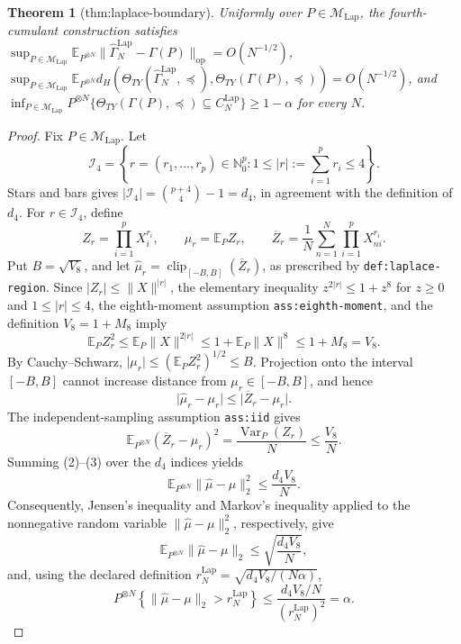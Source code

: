 \documentclass{article}
\newtheorem{theorem}{Theorem}
\begin{document}
\begin{theorem}[thm:laplace-boundary]\label{thm:laplace-boundary}
Uniformly over \(P\in\mathcal M_{\mathrm{Lap}}\), the fourth-cumulant construction satisfies \(\sup_{P\in\mathcal M_{\mathrm{Lap}}}\mathbb E_{P^{\otimes N}}\|\widehat\Gamma_N^{\mathrm{Lap}}-\Gamma(P)\|_{\mathrm{op}}=O(N^{-1/2})\), \(\sup_{P\in\mathcal M_{\mathrm{Lap}}}\mathbb E_{P^{\otimes N}}d_H(\Theta_{TY}(\widehat\Gamma_N^{\mathrm{Lap}},\preceq),\Theta_{TY}(\Gamma(P),\preceq))=O(N^{-1/2})\), and \(\inf_{P\in\mathcal M_{\mathrm{Lap}}}P^{\otimes N}\{\Theta_{TY}(\Gamma(P),\preceq)\subseteq C_N^{\mathrm{Lap}}\}\ge1-\alpha\) for every \(N\).
\end{theorem}
\begin{proof}
Fix \(P\in\mathcal M_{\mathrm{Lap}}\).  Let
\[
 \mathcal I_4=\left\{r=(r_1,\ldots,r_p)\in\mathbb N_0^p:
 1\le |r|:=\sum_{i=1}^p r_i\le 4\right\}.
\]
Stars and bars gives
\(\lvert\mathcal I_4\rvert=\binom{p+4}{4}-1=d_4\), in agreement with
the definition of \(d_4\).  For \(r\in\mathcal I_4\), define
\[
 Z_r=\prod_{i=1}^p X_i^{r_i},\qquad
 \mu_r=\mathbb E_P Z_r,\qquad
 \overline Z_r=\frac1N\sum_{n=1}^N\prod_{i=1}^p X_{ni}^{r_i}.
\]
Put \(B=\sqrt{V_8}\), and let
\(\widehat\mu_r=\operatorname{clip}_{[-B,B]}(\overline Z_r)\), as
prescribed by \texttt{def:laplace-region}.  Since
\(\lvert Z_r\rvert\leq\lVert X\rVert^{|r|}\), the elementary inequality
\(z^{2|r|}\leq 1+z^8\) for \(z\geq0\) and \(1\leq |r|\leq4\), the
eighth-moment assumption \texttt{ass:eighth-moment}, and the definition
\(V_8=1+M_8\) imply
\[
 \mathbb E_P Z_r^2
 \leq \mathbb E_P\lVert X\rVert^{2|r|}
 \leq 1+\mathbb E_P\lVert X\rVert^8
 \leq 1+M_8=V_8.                                      \tag{1}
\]
By Cauchy--Schwarz, \(\lvert\mu_r\rvert\leq
(\mathbb E_PZ_r^2)^{1/2}\leq B\).  Projection onto the interval
\([-B,B]\) cannot increase distance from \(\mu_r\in[-B,B]\), and hence
\[
 \lvert\widehat\mu_r-\mu_r\rvert
 \leq\lvert\overline Z_r-\mu_r\rvert.                 \tag{2}
\]
The independent-sampling assumption \texttt{ass:iid} gives
\[
 \mathbb E_{P^{\otimes N}}(\overline Z_r-\mu_r)^2
 =\frac{\operatorname{Var}_P(Z_r)}{N}
 \leq\frac{V_8}{N}.                                    \tag{3}
\]
Summing (2)--(3) over the \(d_4\) indices yields
\[
 \mathbb E_{P^{\otimes N}}\lVert\widehat\mu-\mu\rVert_2^2
 \leq\frac{d_4V_8}{N}.                                 \tag{4}
\]
Consequently, Jensen's inequality and Markov's inequality applied to the
nonnegative random variable
\(\lVert\widehat\mu-\mu\rVert_2^2\), respectively, give
\[
 \mathbb E_{P^{\otimes N}}\lVert\widehat\mu-\mu\rVert_2
 \leq\sqrt{\frac{d_4V_8}{N}},                           \tag{5}
\]
and, using the declared definition
\(r_N^{\mathrm{Lap}}=\sqrt{d_4V_8/(N\alpha)}\),
\[
 P^{\otimes N}\!\left\{
 \lVert\widehat\mu-\mu\rVert_2>r_N^{\mathrm{Lap}}
 \right\}
 \leq
 \frac{d_4V_8/N}{(r_N^{\mathrm{Lap}})^2}
 =\alpha.                                               \tag{6}
\]


\end{proof}
\end{document}
